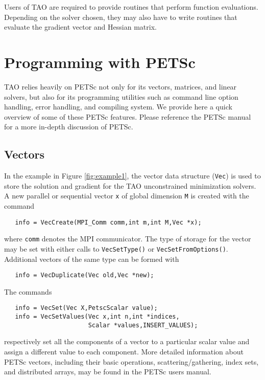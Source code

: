 Users of TAO are required to provide routines that perform function
evaluations. Depending on the solver chosen, they may also have to
write routines that evaluate the gradient vector and Hessian matrix.

\section{Programming with PETSc}
\label{sec:tao_programming}
TAO relies heavily on PETSc not only for its vectors, matrices, and linear
solvers, but also for its programming utilities such as command line option 
handling, error handling, and compiling system.  We provide here a quick 
overview of some of these PETSc features.  Please reference the PETSc 
manual for a more in-depth discussion of PETSc.

\subsection*{Vectors}

In the example in Figure \ref{fig:example1}, the vector data structure
(\texttt{Vec}) is used to store the solution and gradient for the TAO
unconstrained minimization solvers.  A new parallel or sequential
vector \texttt{x} of global dimension \texttt{M} is created with the
command %
\begin{verbatim}
   info = VecCreate(MPI_Comm comm,int m,int M,Vec *x);
\end{verbatim}
\noindent
where \texttt{comm} denotes the MPI communicator. The type of storage
for the vector may be set with either calls to \texttt{VecSetType()}
or \texttt{VecSetFromOptions()}.  Additional vectors of the same type
can be formed with %
\begin{verbatim}
   info = VecDuplicate(Vec old,Vec *new);
\end{verbatim}
\noindent
The commands %
\begin{verbatim}
   info = VecSet(Vec X,PetscScalar value);
   info = VecSetValues(Vec x,int n,int *indices,
                       Scalar *values,INSERT_VALUES);
\end{verbatim}
\noindent
respectively set all the components of a vector to a particular scalar
value and assign a different value to each component.  More detailed
information about PETSc vectors, including their basic operations,
scattering/gathering, index sets, and distributed arrays, may be found
in the PETSc users manual.

